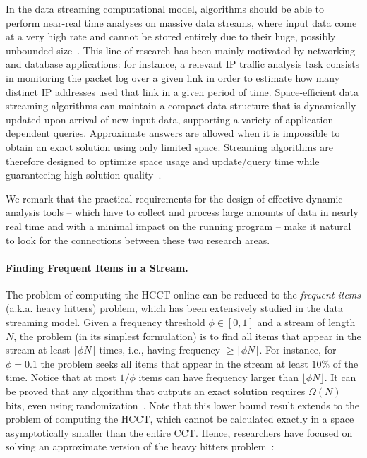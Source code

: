 In the data streaming computational model, algorithms should be able to perform near-real time analyses on massive data streams, where input data come at a very high rate and cannot be stored entirely due to their huge, possibly unbounded size~\cite{Demetrescu07,Muthukrishnan05}. This line of research has been mainly motivated by networking and database applications: for instance, a relevant IP traffic analysis task consists in monitoring the packet log over a given link in order to estimate how many distinct IP addresses used that link in a given period of time. Space-efficient data streaming algorithms can maintain a compact data structure that is dynamically updated upon arrival of new input data, supporting a variety of application-dependent queries. Approximate answers are allowed when it is impossible to obtain an exact solution using only limited space. Streaming algorithms are therefore designed to optimize space usage and update/query time while guaranteeing high solution quality~\cite{Muthukrishnan05}.

We remark that the practical requirements for the design of effective dynamic analysis tools -- which have to collect and process large amounts of data in nearly real time and with a minimal impact on the running program -- make it natural to look for the connections between these two research areas.

\paragraph*{Finding Frequent Items in a Stream.} The problem of computing the HCCT online can be reduced to the {\em frequent items} (a.k.a. heavy hitters) problem, which has been extensively studied in the data streaming model. Given a frequency threshold $\phi\in[0,1]$ and a stream of length $N$, the problem (in its simplest formulation) is to find all items that appear in the stream at least $\lfloor\phi N\rfloor$ times, i.e., having frequency $\ge\lfloor\phi N\rfloor$. For instance, for $\phi=0.1$ the problem seeks all items that appear in the stream at least $10\%$ of the time. Notice that at most $1/\phi$ items can have frequency larger than $\lfloor\phi N\rfloor$.  It can be proved that any algorithm that outputs an exact solution requires $\Omega(N)$ bits, even using randomization~\cite{Muthukrishnan05}. Note that this lower bound result extends to the problem of computing the HCCT, which cannot be calculated exactly in a space asymptotically smaller than the entire CCT. Hence, researchers have focused on solving an approximate version of the heavy hitters problem~\cite{Muthukrishnan05}:

